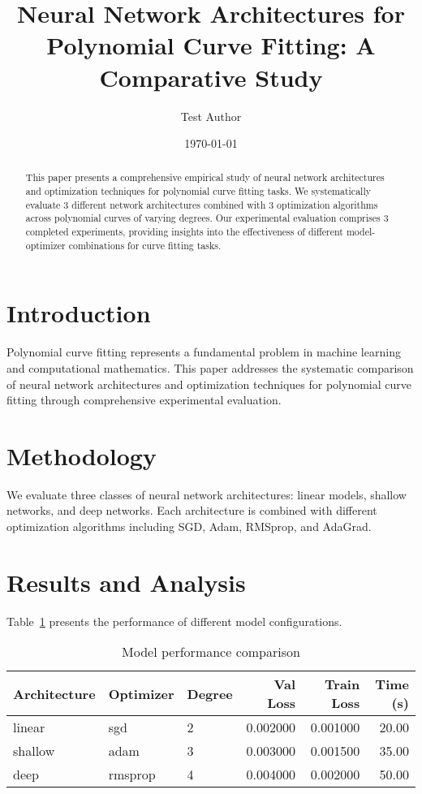 \documentclass[11pt,letterpaper]{article}
\title{Neural Network Architectures for Polynomial Curve Fitting: A Comparative Study}
\author{Test Author}
\date{\today}
\begin{document}
\maketitle

\begin{abstract}
This paper presents a comprehensive empirical study of neural network architectures and optimization techniques for polynomial curve fitting tasks. We systematically evaluate 3 different network architectures combined with 3 optimization algorithms across polynomial curves of varying degrees. Our experimental evaluation comprises 3 completed experiments, providing insights into the effectiveness of different model-optimizer combinations for curve fitting tasks.
\end{abstract}

\section{Introduction}

Polynomial curve fitting represents a fundamental problem in machine learning and computational mathematics. This paper addresses the systematic comparison of neural network architectures and optimization techniques for polynomial curve fitting through comprehensive experimental evaluation.

\section{Methodology}

We evaluate three classes of neural network architectures: linear models, shallow networks, and deep networks. Each architecture is combined with different optimization algorithms including SGD, Adam, RMSprop, and AdaGrad.

\section{Results and Analysis}

Table~\ref{tab:performance} presents the performance of different model configurations.

\begin{table}[h]
\centering
\caption{Model performance comparison}
\label{tab:performance}
\begin{tabular}{@{}lllrrr@{}}
\toprule
Architecture & Optimizer & Degree & Val Loss & Train Loss & Time (s) \\
\midrule
linear & sgd & 2 & 0.002000 & 0.001000 & 20.00 \\
shallow & adam & 3 & 0.003000 & 0.001500 & 35.00 \\
deep & rmsprop & 4 & 0.004000 & 0.002000 & 50.00 \\
\bottomrule
\end{tabular}
\end{table}
\end{document}
